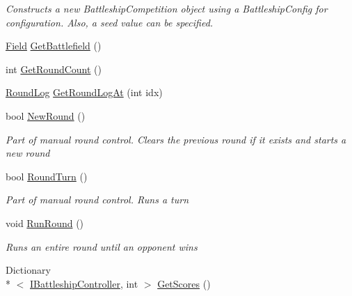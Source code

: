 \begin{DoxyCompactItemize}
\begin{DoxyCompactList}\small\item\em Constructs a new Battleship\-Competition object using a Battleship\-Config for configuration. Also, a seed value can be specified.\end{DoxyCompactList}\item 
\hyperlink{class_m_b_c_1_1_core_1_1_field}{Field} \hyperlink{class_m_b_c_1_1_core_1_1_competition_a5e8a6b945128e37bdd87751d906edaf2}{Get\-Battlefield} ()
\item 
int \hyperlink{class_m_b_c_1_1_core_1_1_competition_a23d9364eaac330e2d3e02f28b76e3f14}{Get\-Round\-Count} ()
\item 
\hyperlink{class_m_b_c_1_1_core_1_1_round_log}{Round\-Log} \hyperlink{class_m_b_c_1_1_core_1_1_competition_a76099b9ae37d3f71c8fc54a7d34f858c}{Get\-Round\-Log\-At} (int idx)
\item 
bool \hyperlink{class_m_b_c_1_1_core_1_1_competition_adb647854be7dcd056af0200aa4693b4e}{New\-Round} ()
\begin{DoxyCompactList}\small\item\em Part of manual round control. Clears the previous round if it exists and starts a new round\end{DoxyCompactList}\item 
bool \hyperlink{class_m_b_c_1_1_core_1_1_competition_a2e64268f0a2cc09469c867b10f2ccf67}{Round\-Turn} ()
\begin{DoxyCompactList}\small\item\em Part of manual round control. Runs a turn\end{DoxyCompactList}\item 
\hypertarget{class_m_b_c_1_1_core_1_1_competition_af2375ef2193559c123404a78fa7cf1a4}{void \hyperlink{class_m_b_c_1_1_core_1_1_competition_af2375ef2193559c123404a78fa7cf1a4}{Run\-Round} ()}\label{class_m_b_c_1_1_core_1_1_competition_af2375ef2193559c123404a78fa7cf1a4}

\begin{DoxyCompactList}\small\item\em Runs an entire round until an opponent wins\end{DoxyCompactList}\item 
\hypertarget{class_m_b_c_1_1_core_1_1_competition_ad235bc0d31dc88cfb661278d0613ec08}{Dictionary\\*
$<$ \hyperlink{interface_m_b_c_1_1_core_1_1_i_battleship_controller}{I\-Battleship\-Controller}, int $>$ \hyperlink{class_m_b_c_1_1_core_1_1_competition_ad235bc0d31dc88cfb661278d0613ec08}{Get\-Scores} ()}\label{class_m_b_c_1_1_core_1_1_competition_ad235bc0d31dc88cfb661278d0613ec08}


\end{DoxyCompactItemize}
